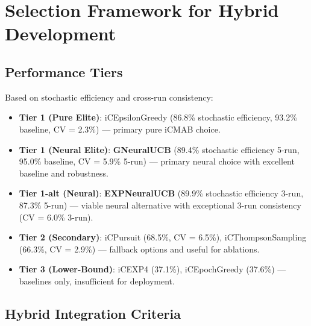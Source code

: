 \documentclass[12pt,a4paper]{article}
\newcommand{\legacy}[1]{\textcolor{legacycolor}{\textbf{#1}}}
\newcommand{\neural}[1]{\textcolor{neuralcolor}{\textbf{#1}}}
\begin{document}
\section{Selection Framework for Hybrid Development}

\subsection{Performance Tiers}

Based on stochastic efficiency and cross-run consistency:

\begin{itemize}
\item \textbf{Tier 1 (Pure Elite)}: iCEpsilonGreedy (86.8\% stochastic efficiency, 93.2\% baseline, CV = 2.3\%) --- primary pure iCMAB choice.
\item \textbf{Tier 1 (Neural Elite)}: \neural{GNeuralUCB} (89.4\% stochastic efficiency 5-run, 95.0\% baseline, CV = 5.9\% 5-run) --- primary neural choice with excellent baseline and robustness.
\item \textbf{Tier 1-alt (Neural)}: \legacy{EXPNeuralUCB} (89.9\% stochastic efficiency 3-run, 87.3\% 5-run) --- viable neural alternative with exceptional 3-run consistency (CV = 6.0\% 3-run).
\item \textbf{Tier 2 (Secondary)}: iCPursuit (68.5\%, CV = 6.5\%), iCThompsonSampling (66.3\%, CV = 2.9\%) --- fallback options and useful for ablations.
\item \textbf{Tier 3 (Lower-Bound)}: iCEXP4 (37.1\%), iCEpochGreedy (37.6\%) --- baselines only, insufficient for deployment.
\end{itemize}

\subsection{Hybrid Integration Criteria}
\end{document}
